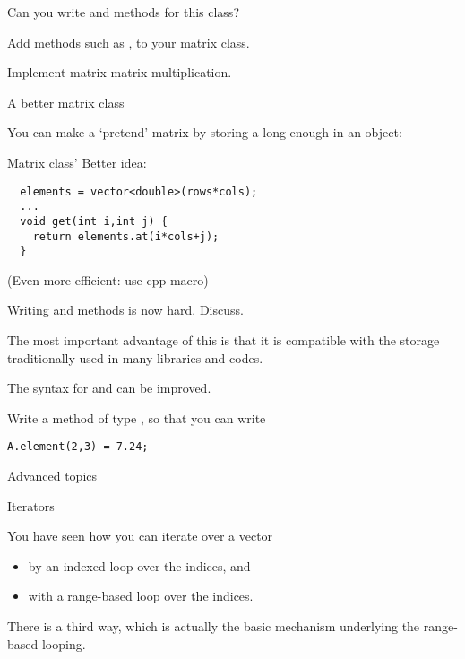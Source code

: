 \begin{exercise}
  \label{ex:matrixclass-rowcol1}
  Can you write  and  methods for this class?
\end{exercise}

\begin{exercise}
  \label{ex:matrix-methods}
  Add methods such as ,  to your matrix class.

  Implement matrix-matrix multiplication.
\end{exercise}

 {A better matrix class}

You can make a `pretend' matrix by storing a long enough  in
an object:
%

\begin{slide}{Matrix class'}
  \label{sl:matrix-class-cont}
  Better idea:
\begin{lstlisting}
  elements = vector<double>(rows*cols);
  ...
  void get(int i,int j) {
    return elements.at(i*cols+j);
  }
\end{lstlisting}
(Even more efficient: use cpp macro)
\end{slide}

\begin{exercise}
  \label{ex:matrixclass-rowcol2}
  Writing  and  methods is now hard. Discuss.  
\end{exercise}

The most important advantage of this is that it is compatible with
the storage traditionally used in 
many libraries and codes.

The syntax for  and  can be improved.
\begin{exercise}
  Write a method  of type , so that you can write
\begin{lstlisting}
A.element(2,3) = 7.24;
\end{lstlisting}
\end{exercise}

 {Advanced topics}

 {Iterators}
\label{sec:iterator}

You have seen how you can iterate over a vector
\begin{itemize}
\item by an indexed loop over the indices, and
\item with a range-based loop over the indices.
\end{itemize}
There is a third way, which is actually the basic mechanism underlying
the range-based looping.


